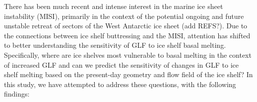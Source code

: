 \documentclass[tc, manuscript]{copernicus}
\begin{document}

There has been much recent and intense interest in the marine ice sheet instability (MISI), primarily in the context of the potential ongoing and future unstable retreat of sectors of the West Antarctic ice sheet (add REFS?). Due to the connections between ice shelf buttressing and the MISI, attention has shifted to better understanding the sensitivity of GLF to ice shelf basal melting. Specifically, where are ice shelves most vulnerable to basal melting in the context of increased GLF and can we predict the sensitivity of changes in GLF to ice shelf melting based on the present-day geometry and flow field of the ice shelf? In this study, we have attempted to address these questions, with the following findings:
\end{document}
